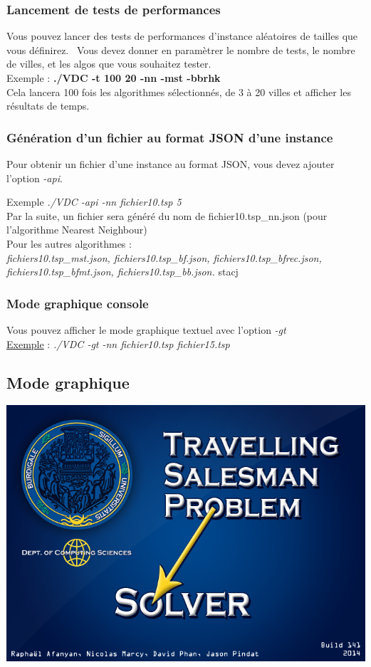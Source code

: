 \documentclass[12pt]{report}
\begin{document}
\subsubsection{Lancement de tests de performances}

Vous pouvez lancer des tests de performances d'instance aléatoires de tailles que vous définirez. \
Vous devez donner en paramètrer le nombre de tests, le nombre de villes, et les algos que vous souhaitez tester. \\

Exemple : \textbf{./VDC -t 100 20 -nn -mst -bbrhk} \\
Cela lancera 100 fois les algorithmes sélectionnés, de 3 à 20 villes et afficher les résultats de temps.

\subsubsection{Génération d'un fichier au format JSON d'une instance}

Pour obtenir un fichier d'une instance au format JSON, vous devez ajouter l'option \textit{-api}.

Exemple \emph{./VDC -api -nn fichier10.tsp 5}\\
Par la suite, un fichier sera généré du nom de fichier10.tsp\_nn.json (pour l'algorithme Nearest Neighbour) \\
Pour les autres algorithmes : \\
\emph{fichiers10.tsp\_mst.json, fichiers10.tsp\_bf.json, fichiers10.tsp\_bfrec.json, fichiers10.tsp\_bfmt.json, fichiers10.tsp\_bb.json.}
stacj
\subsubsection{Mode graphique console}

Vous pouvez afficher le mode graphique textuel avec l'option \textit{-gt} \\
\underline{Exemple} : \emph{./VDC -gt -nn fichier10.tsp fichier15.tsp}

\subsection{Mode graphique}
\includegraphics[width=\textwidth]{tsplogo.png} \\
\end{document}
